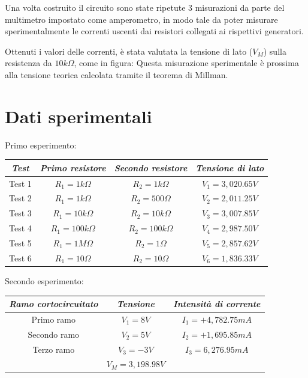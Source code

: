     Una volta costruito il circuito sono state ripetute 3 misurazioni da parte del multimetro impostato come 
    amperometro, in modo tale da poter misurare sperimentalmente le correnti uscenti dai resistori collegati ai rispettivi generatori.\par
    Ottenuti i valori delle correnti, è stata valutata la tensione di lato ($V_M$) sulla resistenza da $10k\Omega$, come in figura:
    Questa misurazione sperimentale è prossima alla tensione teorica calcolata tramite il teorema di Millman.\par



    \section{Dati sperimentali}
    \begin{center}
        Primo esperimento: \par
    \begin{tabular}{|c|c|c|c|}
        \hline
        \textit{Test} & \textit{Primo resistore} & \textit{Secondo resistore} & \textit{Tensione di lato} \\
        \hline
        Test 1 & $R_1 =1k\Omega$ & $R_2=1k\Omega$ & $V_1=3,020.65V$\\
        \hline
        Test 2 & $R_1 =1k\Omega$ & $R_2=500\Omega$ & $V_2=2,011.25V$\\
        \hline
        Test 3 & $R_1 =10k\Omega$ & $R_2=10k\Omega$ & $V_3=3,007.85V$\\
        \hline
        Test 4 & $R_1 =100k\Omega$ & $R_2=100k\Omega$ & $V_4=2,987.50V$\\
        \hline
        Test 5 & $R_1 =1M\Omega$ & $R_2=1\Omega$ & $V_5=2,857.62V$\\
        \hline
        Test 6 & $R_1 =10\Omega$ & $R_2=10\Omega$ & $V_6=1,836.33V$\\
        \hline
    
    \end{tabular}
    \end{center}
    
    \begin{center}
        Secondo esperimento: \par
    \begin{tabular}{|c|c|c|}
        \hline
        \textit{Ramo cortocircuitato} & \textit{Tensione} & \textit{Intensità di corrente} \\
        \hline
        Primo ramo & $V_1 = 8V$ & $I_1 = +4,782.75 mA$\\
        \hline
        Secondo ramo & $V_2 = 5V$ & $I_2 = +1,695.85 mA$\\
        \hline
        Terzo ramo & $V_3 = -3V$ & $I_3 = 6,276.95 mA$\\
        \hline
        & $V_M = 3,198.98V$&\\
        \hline
    
    \end{tabular}
    \end{center}


